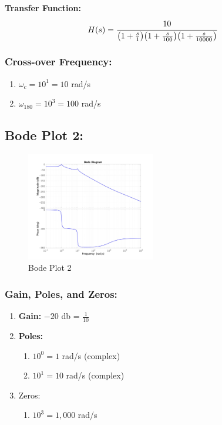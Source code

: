\documentclass[letter]{article}
\numberwithin{equation}{section}
\begin{document}
\textbf{Transfer Function:}\[
	H(s) = \cfrac{10}{
		\qty(1 + \frac{s}{1}) \qty(1 + \frac{s}{100}) \qty(1 + \frac{s}{10000})
		}
\]

\subsubsection{Cross-over Frequency:}
\begin{enumerate}
	\item $\omega_c = 10^{1} = 10$ rad/s
	\item $\omega_{180} = 10^{3} = 100$ rad/s
\end{enumerate}



\newpage
\subsection{Bode Plot 2:}
\begin{figure}[h]
	\centering
	\includegraphics[width=0.5\textwidth]{figs/pblm3b.jpg}
	\caption{Bode Plot 2}
\end{figure}

\subsubsection{Gain, Poles, and Zeros:}
\begin{enumerate}
	\item \textbf{Gain:}  $-20$ db = $\frac{1}{10}$
	\item \textbf{Poles:}
	\begin{enumerate}
		\item $10^{0} = 1$ rad/s (complex)
		\item $10^{1} = 10$ rad/s (complex)
	\end{enumerate}
	\item Zeros:
	\begin{enumerate}
		\item $10^{3} = 1,000$ rad/s
	\end{enumerate}
\end{enumerate}
\end{document}
